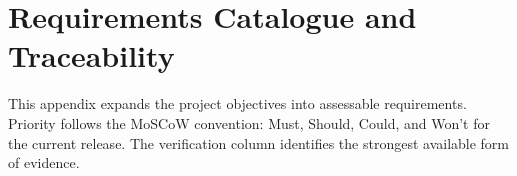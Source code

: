 
\newcommand{\EvidenceSheet}[7]{%
\clearpage
\section{#1}
\noindent
\begin{tabularx}{\textwidth}{>{\bfseries}p{3.5cm}X}
\toprule
Identifier & #2 \\
Purpose & #3 \\
Preconditions & #4 \\
Procedure or decision & #5 \\
Acceptance evidence & #6 \\
Residual risk & #7 \\
\bottomrule
\end{tabularx}
\vspace{0.8cm}

\noindent\textbf{Traceability note.}
This record connects a stated project requirement to a concrete implementation
or verification activity. It is retained as submission evidence so that the
system can be assessed against observable behaviour rather than feature claims
alone.
}

\chapter{Requirements Catalogue and Traceability}
\label{app:traceability}

This appendix expands the project objectives into assessable requirements.
Priority follows the MoSCoW convention: Must, Should, Could, and Won't for the
current release. The verification column identifies the strongest available
form of evidence.

